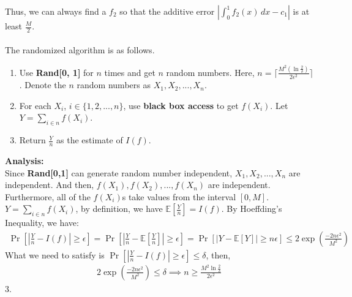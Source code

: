 Thus, we can always find a $f_2$ so that the additive error $|\int_{0}^{1} f_2(x) \,dx - c_1|$ is at least $\frac{M}{2}$.
\\
\noindent {}\\
The randomized algorithm is as follows.
\begin{enumerate}
    \item Use \textbf{Rand[0, 1]} for $n$ times and get $n$ random numbers.
    Here, $n=\lceil \frac{M^2(\ln \frac{2}{\delta})}{2\epsilon^2}\rceil $.
    Denote the $n$ random numbers as $X_1, X_2, ..., X_{n}$.
    \item For each $X_i$, $i\in \{1,2,...,n\}$, use \textbf{black box access} to get $f(X_i)$.
    Let $Y=\sum_{i\in n}f(X_i)$.
    \item Return $\frac{Y}{n}$ as the estimate of $I(f)$.
\end{enumerate}
\textbf{Analysis:}\\
Since \textbf{Rand[0,1]} can generate random number independent,
$X_1, X_2,..., X_{n}$ are independent.
And then, $f(X_1), f(X_2),..., f(X_{n})$ are independent.
Furthermore, all of the $f(X_i)$s take values from the interval $[0, M]$.
$Y=\sum_{i\in n}f(X_i)$, by definition, we have $\mathbb{E}[\frac{Y}{n}]=I(f)$.
By Hoeffding's Inequality, we have:
\begin{align}
    \nonumber \Pr[|\frac{Y}{n}-I(f)|\ge\epsilon]=\Pr[|\frac{Y}{n}-\mathbb{E}[\frac{Y}{n}]|\ge\epsilon]
    =\Pr[|Y-\mathbb{E}[Y]|\ge n\epsilon]\le 2\exp({\frac{-2n\epsilon^2}{M^2}})
\end{align}
What we need to satisfy is $\Pr[|\frac{Y}{n}-I(f)|\ge\epsilon]\le \delta$, then,
\begin{align}
    \nonumber 2\exp({\frac{-2n\epsilon^2}{M^2}}) \le \delta \implies n\ge \frac{M^2\ln \frac{2}{\delta}}{2\epsilon^2}
\end{align}
3.
